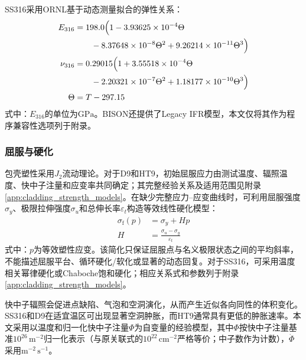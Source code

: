 SS316采用ORNL基于动态测量拟合的弹性关系\cite{Hammond1979ornl5442}：
\begin{subequations}\label{eq:ss316_elastic_properties}
	\begin{align}
		E_{316}
		&=198.0\Bigl(
		1-3.93625\times10^{-4}\Theta
		\notag\\
		&\qquad
		-8.37648\times10^{-8}\Theta^2
		+9.26214\times10^{-11}\Theta^3
		\Bigr)
		\label{eq:ss316_youngs_modulus}\\
		\nu_{316}
		&=0.29015\Bigl(
		1+3.55518\times10^{-4}\Theta
		\notag\\
		&\qquad
		-2.20321\times10^{-7}\Theta^2
		+1.18177\times10^{-10}\Theta^3
		\Bigr)
		\label{eq:ss316_poisson_ratio}\\
		\Theta&=T-297.15
		\label{eq:ss316_reduced_temperature}
	\end{align}
\end{subequations}
式中：$E_{316}$的单位为$\mathrm{GPa}$。BISON还提供了Legacy IFR模型，本文仅将其作为程序兼容性选项列于附录。

\subsubsection{屈服与硬化}

包壳塑性采用$J_2$流动理论。对于D9和HT9，初始屈服应力由测试温度、辐照温度、快中子注量和应变率共同确定；其完整经验关系及适用范围见附录\ref{app:cladding_strength_models}。在缺少完整应力--应变曲线时，可利用屈服强度$\sigma_y$、极限拉伸强度$\sigma_u$和总伸长率$\varepsilon_t$构造等效线性硬化模型：
\begin{subequations}\label{eq:clad_linear_hardening}
	\begin{align}
		\sigma_{\mathrm f}(p)&=\sigma_y+Hp
		\label{eq:clad_flow_stress}\\
		H&=\frac{\sigma_u-\sigma_y}{\varepsilon_t}
		\label{eq:clad_hardening_modulus}
	\end{align}
\end{subequations}
式中：$p$为等效塑性应变。该简化只保证屈服点与名义极限状态之间的平均斜率，不能描述屈服平台、循环硬化/软化或显著的动态回复。对于SS316，可采用温度相关幂律硬化或Chaboche饱和硬化；相应关系式和参数列于附录\ref{app:cladding_strength_models}。

\label{sec:cladding_irradiation_swelling}

快中子辐照会促进点缺陷、气泡和空洞演化，从而产生近似各向同性的体积变化。SS316和D9在适宜温区可出现显著空洞肿胀，而HT9通常具有更低的肿胀速率。本文采用以温度和归一化快中子注量$\Phi$为自变量的经验模型，其中$\Phi$按快中子注量基准$10^{26}\,\mathrm{m^{-2}}$归一化表示（与原关联式的$10^{22}\,\mathrm{cm^{-2}}$严格等价；中子数作为计数），$\dot{\Phi}$采用$\mathrm{m^{-2}\,s^{-1}}$\cite{halesBISONTheoryManual2016,hofmanMetallicFuelsHandbook2019}。

